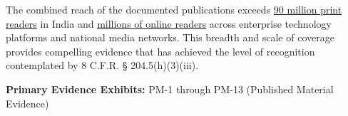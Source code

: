 The combined reach of the documented publications exceeds \underline{90 million print readers} in India and \underline{millions of online readers} across enterprise technology platforms and national media networks. This breadth and scale of coverage provides compelling evidence that \dr has achieved the level of recognition contemplated by 8 C.F.R. § 204.5(h)(3)(iii).

\textbf{Primary Evidence Exhibits:} PM-1 through PM-13 (Published Material Evidence)

